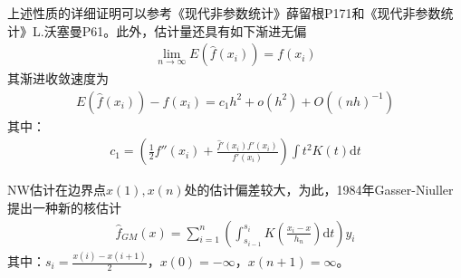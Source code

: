             \par
            上述性质的详细证明可以参考《现代非参数统计》薛留根P171和《现代非参数统计》L.沃塞曼P61。此外，估计量还具有如下渐进无偏
            \begin{align*}
            \lim\limits _{n\rightarrow\infty} E(\hat{f}(x_i)) = f(x_i)
            \end{align*}
            其渐进收敛速度为
            \begin{align*}
            E(\hat{f}(x_i)) - f(x_i) = c_1h^2+o(h^2) + O((nh)^{-1})
            \end{align*}
            其中：
            \begin{align*}
            c_1 = \left( \frac{1}{2}f''(x_i) + \frac{\hat{f}'(x_i)f'(x_i)}{f'(x_i)} \right) \int t^2K(t)\mathrm{d}t
            \end{align*}
            \par
            NW估计在边界点$x(1),x(n)$处的估计偏差较大，为此，1984年Gasser-Niuller提出一种新的核估计
            \begin{align*}
            \hat{f}_{GM}(x) = \sum_{i = 1}^n \left( \int_{s_{i-1}}^{s_i} K \left(\frac{x_i - x}{h_n} \right) \mathrm{d}t \right)   y_i
            \end{align*}
            其中：$s_i = \frac{x(i) - x(i+1)}{2}$，$x(0)  = -\infty$，$x(n+1) = \infty$。


